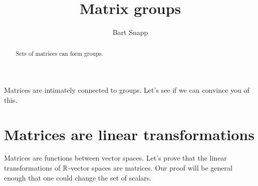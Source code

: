 \documentclass{ximera}
\author{Bart Snapp}
\title{Matrix groups}
\begin{document}
\begin{abstract}
  Sets of matrices can form groups.
\end{abstract}
\maketitle



Matrices are intimately connected to groups. Let's see if we can
convince you of this.


\section{Matrices are linear transformations}

Matrices are functions between vector spaces. Let's prove that the
linear transformations of $\mathbb R$-vector spaces are matrices. Our proof
will be general enough that one could change the set of scalars.
\end{document}
